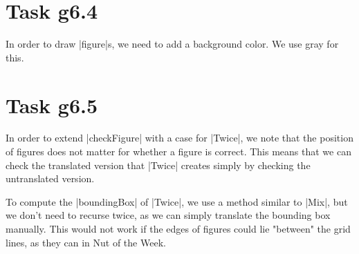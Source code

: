 \documentclass[a4paper]{article}
\begin{document}
\section{Task g6.4}

In order to draw \code|figure|s, we need to add a background color. We use gray for this.


\section{Task g6.5}

In order to extend \code|checkFigure| with a case for \code|Twice|, we note that the position of figures does not matter for whether a figure is correct. This means that we can check the translated version that \code|Twice| creates simply by checking the untranslated version.


\noindent To compute the \code|boundingBox| of \code|Twice|, we use a method similar to \code|Mix|, but we don't need to recurse twice, as we can simply translate the bounding box manually. This would not work if the edges of figures could lie "between" the grid lines, as they can in Nut of the Week.
\end{document}
